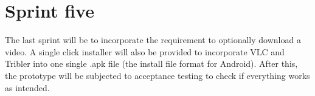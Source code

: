 \section{Sprint five}
The last sprint will be to incorporate the requirement to optionally download a video. A single click installer will also be provided to incorporate VLC and Tribler into one single .apk file (the install file format for Android). After this, the prototype will be subjected to acceptance testing to check if everything works as intended.